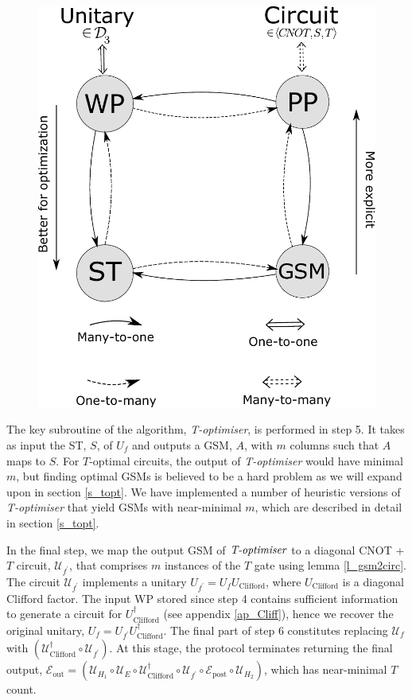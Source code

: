 \documentclass[notitlepage]{article}
\theoremstyle{definition}
\theoremstyle{problem}
\theoremstyle{lemma}
\begin{document}
\begin{figure}
	\centering
	\includegraphics[width=1\linewidth]{maprep}
	\caption{}
	\label{fig_maprep}
\end{figure}

The key subroutine of the algorithm, \emph{T-optimiser}, is performed in step 5. It takes as input the ST, $S$, of $U_f$ and outputs a GSM, $A$, with $m$ columns such that $A$ maps to $S$. For $T$-optimal circuits, the output of \emph{T-optimiser} would have minimal $m$, but finding optimal GSMs is believed to be a hard problem as we will expand upon in section \ref{s_topt}. We have implemented a number of heuristic versions of \emph{T-optimiser} that yield GSMs with near-minimal $m$, which are described in detail in section \ref{s_topt}.

In the final step, we map the output GSM of $\emph{T-optimiser}$ to a diagonal CNOT + $T$ circuit, $\mathcal{U}_{f^\prime}$, that comprises $m$ instances of the $T$ gate using lemma \ref{l_gsm2circ}. The circuit $\mathcal{U}_{f^\prime}$ implements a unitary $U_{f^\prime}=U_fU_{\text{Clifford}}$, where $U_{\text{Clifford}}$ is a diagonal Clifford factor. The input WP stored since step 4 contains sufficient information to generate a circuit for $U_{\text{Clifford}}^\dagger$ (see appendix \ref{ap_Cliff}), hence we recover the original unitary, $U_f=U_{f^\prime} U_{\text{Clifford}}^\dagger$. The final part of step 6 constitutes replacing $\mathcal{U}_f$ with $(\mathcal{U}^\dagger_{\text{Clifford}}\circ\mathcal{U}_{f^\prime})$. At this stage, the protocol terminates returning the final output, $\mathcal{E}_{\text{out}} = (\mathcal{U}_{H_1}\circ \mathcal{U}_E \circ \mathcal{U}^\dagger_{\text{Clifford}}\circ\mathcal{U}_{f^\prime} \circ \mathcal{E}_{\text{post}}\circ \mathcal{U}_{H_2})$, which has near-minimal $T$ count.
\end{document}
